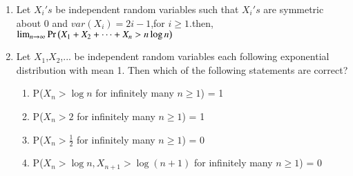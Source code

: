 \renewcommand{\theequation}{\theenumi}
\renewcommand{\thefigure}{\theenumi}
\renewcommand{\thetable}{\theenumi}
\begin{enumerate}[label=\thesection.\arabic*.,ref=\thesection.\theenumi]


%
\item Let $X_i 's$ be independent random variables such that $X_i 's$ are symmetric about 0 and $var(X_i)=2i - 1$,for $i\geq 1$.then,
$\lim_{n \to \infty}\Pr\left(X_1 +X_2 + \dots + X_n > n\log{n}\right)$
\begin{enumerate}
\end{enumerate}
%
\solution

%
%
\item Let $X_1$,$X_2$,... be independent random variables each following exponential distribution with mean 1. Then which of the following statements are correct?
\begin{enumerate}
    \item P($X_n > \log n$ for infinitely many $n \geq 1$) = 1
    \item P($X_n > 2$ for infinitely many $n \geq 1$) = 1
    \item P($X_n > \frac{1}{2}$ for infinitely many $n \geq 1$) = 0
    \item P($X_n > \log n, X_{n+1}>\log (n+1)$ for infinitely many $n \geq 1$) = 0
\end{enumerate}
%
\solution



\end{enumerate}